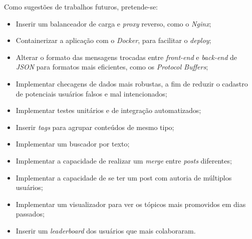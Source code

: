 Como sugestões de trabalhos futuros, pretende-se:
\begin{itemize}
    \item Inserir um balanceador de carga e \textit{proxy} reverso, como o \textit{Nginx};
    \item Containerizar a aplicação com o \textit{Docker}, para facilitar o \textit{deploy};
    \item Alterar o formato das mensagens trocadas entre \textit{front-end} e \textit{back-end} de \textit{JSON} para formatos mais eficientes, como os \textit{Protocol Buffers};
    \item Implementar checagens de dados mais robustas, a fim de reduzir o cadastro de potenciais usuários falsos e mal intencionados;
    \item Implementar testes unitários e de integração automatizados;
    \item Inserir \textit{tags} para agrupar conteúdos de mesmo tipo;
    \item Implementar um buscador por texto;
    \item Implementar a capacidade de realizar um \textit{merge} entre \textit{posts} diferentes;
    \item Implementar a capacidade de se ter um post com autoria de múltiplos usuários;
    \item Implementar um visualizador para ver os tópicos mais promovidos em dias passados;
    \item Inserir um \textit{leaderboard} dos usuários que mais colaboraram.
\end{itemize}